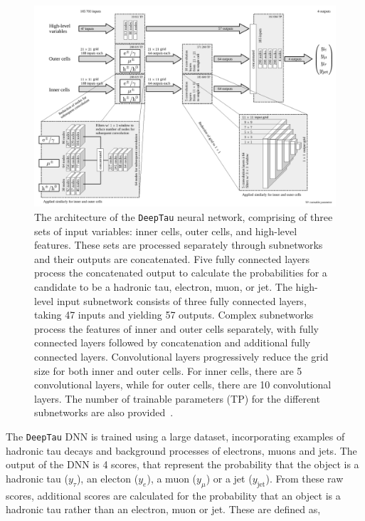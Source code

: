 \begin{figure}[!hbtp]
\centering
    \includegraphics[width=\textwidth]{Figures/deeptau.pdf}
\caption{The architecture of the \texttt{DeepTau} neural network, comprising of three sets of input variables: inner cells, outer cells, and high-level features. These sets are processed separately through subnetworks and their outputs are concatenated. Five fully connected layers process the concatenated output to calculate the probabilities for a candidate to be a hadronic tau, electron, muon, or jet. The high-level input subnetwork consists of three fully connected layers, taking 47 inputs and yielding 57 outputs. Complex subnetworks process the features of inner and outer cells separately, with fully connected layers followed by concatenation and additional fully connected layers. Convolutional layers progressively reduce the grid size for both inner and outer cells. For inner cells, there are 5 convolutional layers, while for outer cells, there are 10 convolutional layers. The number of trainable parameters (TP) for the different subnetworks are also provided~\cite{CMS:2022prd}.}
\label{fig:deeptau}
\end{figure}

The \texttt{DeepTau} \ac{DNN} is trained using a large dataset, incorporating examples of hadronic tau decays and background processes of electrons, muons and jets. 
The output of the \ac{DNN} is 4 scores, that represent the probability that the object is a hadronic tau ($y_\tau$), an electon ($y_e$), a muon ($y_\mu$) or a jet ($y_{\text{jet}}$).
From these raw scores, additional scores are calculated for the probability that an object is a hadronic tau rather than an electron, muon or jet.
These are defined as,

